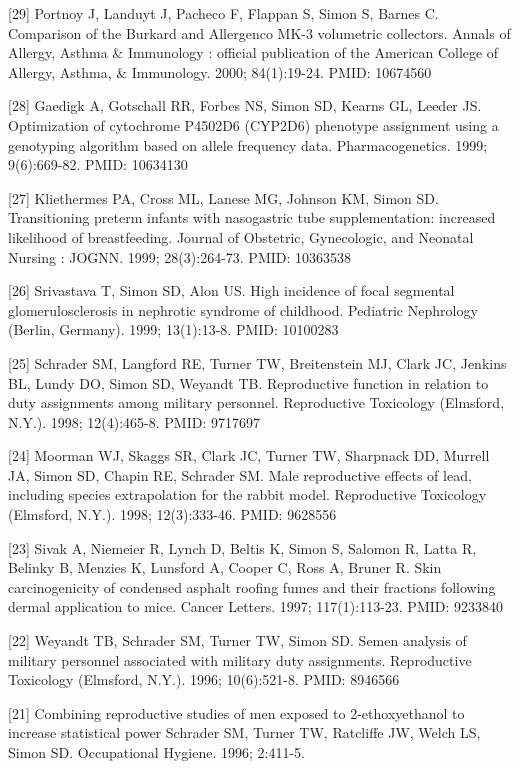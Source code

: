 \documentclass[
  12pt,
]{article}
\begin{document}
{[}29{]} Portnoy J, Landuyt J, Pacheco F, Flappan S, Simon S, Barnes C.
Comparison of the Burkard and Allergenco MK-3 volumetric collectors.
Annals of Allergy, Asthma \& Immunology : official publication of the
American College of Allergy, Asthma, \& Immunology. 2000; 84(1):19-24.
PMID: 10674560

{[}28{]} Gaedigk A, Gotschall RR, Forbes NS, Simon SD, Kearns GL, Leeder
JS. Optimization of cytochrome P4502D6 (CYP2D6) phenotype assignment
using a genotyping algorithm based on allele frequency data.
Pharmacogenetics. 1999; 9(6):669-82. PMID: 10634130

{[}27{]} Kliethermes PA, Cross ML, Lanese MG, Johnson KM, Simon SD.
Transitioning preterm infants with nasogastric tube supplementation:
increased likelihood of breastfeeding. Journal of Obstetric,
Gynecologic, and Neonatal Nursing : JOGNN. 1999; 28(3):264-73. PMID:
10363538

{[}26{]} Srivastava T, Simon SD, Alon US. High incidence of focal
segmental glomerulosclerosis in nephrotic syndrome of childhood.
Pediatric Nephrology (Berlin, Germany). 1999; 13(1):13-8. PMID: 10100283

{[}25{]} Schrader SM, Langford RE, Turner TW, Breitenstein MJ, Clark JC,
Jenkins BL, Lundy DO, Simon SD, Weyandt TB. Reproductive function in
relation to duty assignments among military personnel. Reproductive
Toxicology (Elmsford, N.Y.). 1998; 12(4):465-8. PMID: 9717697

{[}24{]} Moorman WJ, Skaggs SR, Clark JC, Turner TW, Sharpnack DD,
Murrell JA, Simon SD, Chapin RE, Schrader SM. Male reproductive effects
of lead, including species extrapolation for the rabbit model.
Reproductive Toxicology (Elmsford, N.Y.). 1998; 12(3):333-46. PMID:
9628556

{[}23{]} Sivak A, Niemeier R, Lynch D, Beltis K, Simon S, Salomon R,
Latta R, Belinky B, Menzies K, Lunsford A, Cooper C, Ross A, Bruner R.
Skin carcinogenicity of condensed asphalt roofing fumes and their
fractions following dermal application to mice. Cancer Letters. 1997;
117(1):113-23. PMID: 9233840

{[}22{]} Weyandt TB, Schrader SM, Turner TW, Simon SD. Semen analysis of
military personnel associated with military duty assignments.
Reproductive Toxicology (Elmsford, N.Y.). 1996; 10(6):521-8. PMID:
8946566

{[}21{]} Combining reproductive studies of men exposed to
2-ethoxyethanol to increase statistical power Schrader SM, Turner TW,
Ratcliffe JW, Welch LS, Simon SD. Occupational Hygiene. 1996; 2:411-5.
\end{document}

